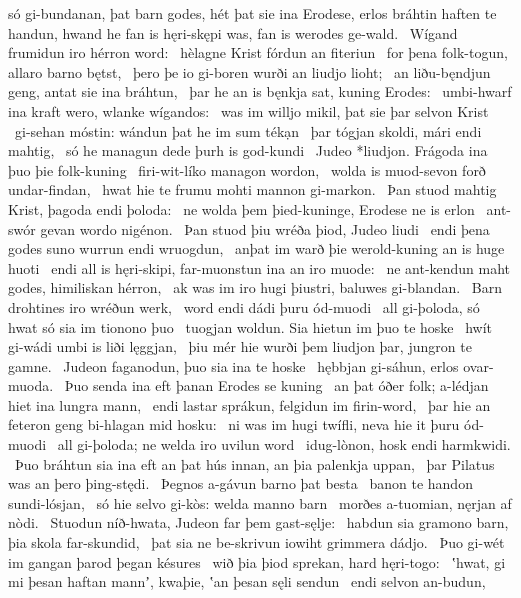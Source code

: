 só gi-bundanan, þat barn godes,
hét þat sie ina Erodese, erlos bráhtin
haften te handun, hwand he fan is hęri-skępi was,
fan is werodes ge-wald. \hld\ Wígand frumidun
iro hérron word: \hld\ hèlagne Krist
fórdun an fiteriun \hld\ for þena folk-togun,
allaro barno bętst, \hld\ þero þe io gi-boren wurði
an liudjo lioht; \hld\ an liðu-bęndjun geng,
antat sie ina bráhtun, \hld\ þar he an is bęnkja sat,
kuning Erodes: \hld\ umbi-hwarf ina kraft wero,
wlanke wígandos: \hld\ was im willjo mikil,
þat sie þar selvon Krist \hld\ gi-sehan móstin:
wándun þat he im sum tékạn \hld\ þar tógjan skoldi,
mári endi mahtig, \hld\ só he managun dede
þurh is god-kundi \hld\ Judeo *liudjon.
Frágoda ina þuo þie folk-kuning \hld\ firi-wit-líko
managon wordon, \hld\ wolda is muod-sevon
forð undar-findan, \hld\ hwat hie te frumu mohti
mannon gi-markon. \hld\ Þan stuod mahtig Krist,
þagoda endi þoloda: \hld\ ne wolda þem þied-kuninge,
Erodese ne is erlon \hld\ ant-swór gevan
wordo nigénon. \hld\ Þan stuod þiu wréða þiod,
Judeo liudi \hld\ endi þena godes suno
wurrun endi wruogdun, \hld\ anþat im warð þie werold-kuning
an is huge huoti \hld\ endi all is hęri-skipi,
far-muonstun ina an iro muode: \hld\ ne ant-kendun maht godes,
himiliskan hérron, \hld\ ak was im iro hugi þiustri,
baluwes gi-blandan. \hld\ Barn drohtines
iro wréðun werk, \hld\ word endi dádi
þuru ód-muodi \hld\ all gi-þoloda,
só hwat só sia im tionono þuo \hld\ tuogjan woldun.
Sia hietun im þuo te hoske \hld\ hwít gi-wádi
umbi is liði lęggjan, \hld\ þiu mér hie wurði þem liudjon þar,
jungron te gamne. \hld\ Judeon faganodun,
þuo sia ina te hoske \hld\ hębbjan gi-sáhun,
erlos ovar-muoda. \hld\ Þuo senda ina eft þanan
Erodes se kuning \hld\ an þat óðer folk;
a-lédjan hiet ina lungra mann, \hld\ endi lastar sprákun,
felgidun im firin-word, \hld\ þar hie an feteron geng
bi-hlagan mid hosku: \hld\ ni was im hugi twífli,
neva hie it þuru ód-muodi \hld\ all gi-þoloda;
ne welda iro uvilun word \hld\ idug-lònon,
hosk endi harmkwidi. \hld\ Þuo bráhtun sia ina eft an þat hús innan,
an þia palenkja uppan, \hld\ þar Pilatus was
an þero þing-stędi. \hld\ Þegnos a-gávun
barno þat besta \hld\ banon te handon
sundi-lósjan, \hld\ só hie selvo gi-kòs:
welda manno barn \hld\ morðes a-tuomian,
nęrjan af nòdi. \hld\ Stuodun níð-hwata,
Judeon far þem gast-sęlje: \hld\ habdun sia gramono barn,
þia skola far-skundid, \hld\ þat sia ne be-skrivun iowiht
grimmera dádjo. \hld\ Þuo gi-wét im gangan þarod
þegan késures \hld\ wið þia þiod sprekan,
hard hęri-togo: \hld\ ʽhwat, gi mi þesan haftan mannʼ, kwaþie,
ʽan þesan sęli sendun \hld\ endi selvon an-budun,
